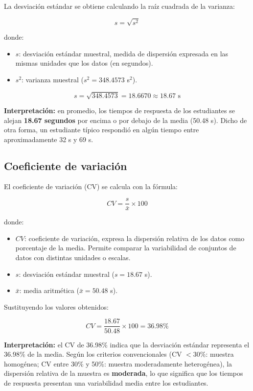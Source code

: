 \documentclass[12pt,letterpaper]{article}
\begin{document}
La desviación estándar se obtiene calculando la raíz cuadrada de la varianza:

\[
s=\sqrt{s^2}
\]

donde:
\begin{itemize}[leftmargin=1.2cm]
    \item $s$: desviación estándar muestral, medida de dispersión expresada en las mismas unidades que los datos (en segundos).
    \item $s^2$: varianza muestral ($s^2 = 348.4573$ s$^2$).
\end{itemize}

\[
s=\sqrt{348.4573}=18.6670 \approx 18.67 \text{ s}
\]

\textbf{Interpretación:} en promedio, los tiempos de respuesta de los estudiantes se alejan \textbf{18.67 segundos} por encima o por debajo de la media (50.48 s). Dicho de otra forma, un estudiante típico respondió en algún tiempo entre aproximadamente 32 s y 69 s.

\subsection{Coeficiente de variación}

El coeficiente de variación (CV) se calcula con la fórmula:

\[
CV=\frac{s}{\bar{x}}\times 100
\]

donde:
\begin{itemize}[leftmargin=1.2cm]
    \item $CV$: coeficiente de variación, expresa la dispersión relativa de los datos como porcentaje de la media. Permite comparar la variabilidad de conjuntos de datos con distintas unidades o escalas.
    \item $s$: desviación estándar muestral ($s = 18.67$ s).
    \item $\bar{x}$: media aritmética ($\bar{x} = 50.48$ s).
\end{itemize}

Sustituyendo los valores obtenidos:

\[
CV=\frac{18.67}{50.48}\times 100=36.98\%
\]

\textbf{Interpretación:} el CV de 36.98\% indica que la desviación estándar representa el 36.98\% de la media. Según los criterios convencionales (CV $< 30\%$: muestra homogénea; CV entre 30\% y 50\%: muestra moderadamente heterogénea), la dispersión relativa de la muestra es \textbf{moderada}, lo que significa que los tiempos de respuesta presentan una variabilidad media entre los estudiantes.
\end{document}
